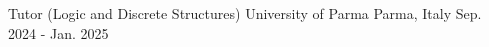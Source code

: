 \begin{cventries}
  \cventry
  {Tutor (Logic and Discrete Structures)} %
  {University of Parma} %
  {Parma, Italy} %
  {Sep. 2024 - Jan. 2025} %
  { \hfill }

\end{cventries}
